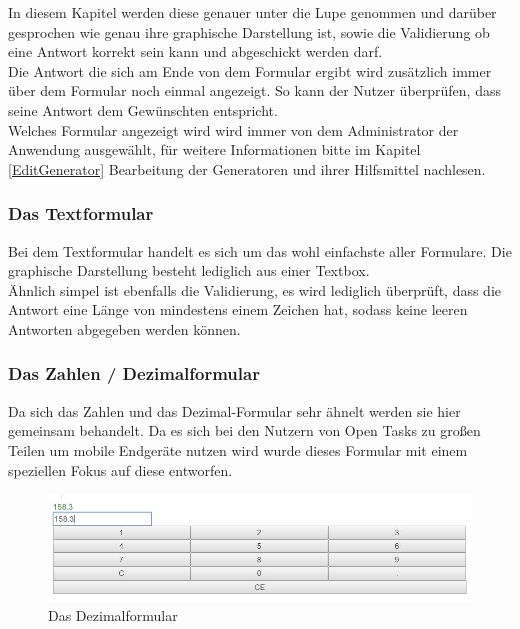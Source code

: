 In diesem Kapitel werden diese genauer unter die Lupe genommen und darüber gesprochen wie genau ihre graphische Darstellung ist, sowie die Validierung ob eine Antwort korrekt sein kann und abgeschickt werden darf. \\
Die Antwort die sich am Ende von dem Formular ergibt wird zusätzlich immer über dem Formular noch einmal angezeigt. So kann der Nutzer überprüfen, dass seine Antwort dem Gewünschten entspricht. \\
Welches Formular angezeigt wird wird immer von dem Administrator der Anwendung ausgewählt, für weitere Informationen bitte im Kapitel \ref{EditGenerator} Bearbeitung der Generatoren und ihrer Hilfsmittel nachlesen.


\subsubsection{Das Textformular}

Bei dem Textformular handelt es sich um das wohl einfachste aller Formulare. Die graphische Darstellung besteht lediglich aus einer Textbox. \\
Ähnlich simpel ist ebenfalls die Validierung, es wird lediglich überprüft, dass die Antwort eine Länge von mindestens einem Zeichen hat, sodass keine leeren Antworten abgegeben werden können.

\subsubsection{Das Zahlen / Dezimalformular}

Da sich das Zahlen und das Dezimal-Formular sehr ähnelt werden sie hier gemeinsam behandelt. Da es sich bei den Nutzern von Open Tasks zu großen Teilen um mobile Endgeräte nutzen wird wurde dieses Formular mit einem speziellen Fokus auf diese entworfen.

\begin{figure}[htp]     %
\centering
\includegraphics[width=1\textwidth]{bilder/DezimalForm} 
\caption[Das Dezimalformular]{Das Dezimalformular}
\end{figure} 


